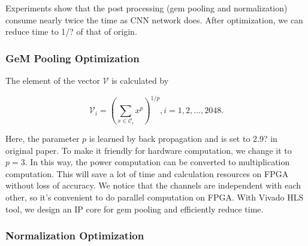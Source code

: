 Experiments show that the post processing (gem pooling and normalization) consume nearly twice the time as CNN network does. After optimization, we can reduce time to 1/? of that of origin.

\subsubsection{GeM Pooling Optimization}

The element of the vector $\mathcal{V}$ is calculated by

\begin{equation}
    \mathcal{V}_i = (\sum_{x \in \mathcal{C}_i} x^p)^{1/p}, i=1, 2, ..., 2048.
\end{equation}

Here, the parameter $p$ is learned by back propagation and is set to 2.9? in original paper. To make it friendly for hardware computation, we change it to $p=3$. In this way, the power computation can be converted to multiplication computation. This will save a lot of time and calculation resources on FPGA without loss of accuracy. We notice that the channels are independent with each other, so it's convenient to do parallel computation on FPGA. With Vivado HLS tool, we design an IP core for gem pooling and efficiently reduce time.

\subsubsection{Normalization Optimization}